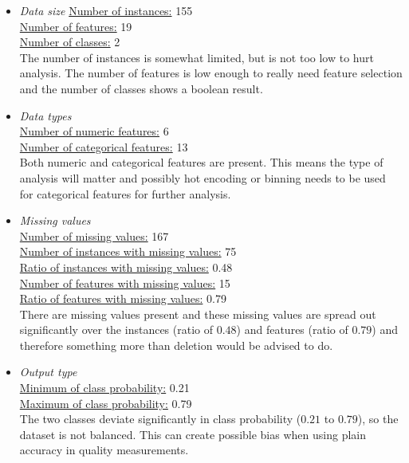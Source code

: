 \documentclass[10pt,a4paper]{report}
\begin{document}
	\begin{itemize}
		\item \textit{Data size}
		\underline{Number of instances:} 155 \\
		\underline{Number of features:} 19\\
		\underline{Number of classes:} 2\\
		
		The number of instances is somewhat limited, but is not too low to hurt analysis. The number of features is low enough to really need feature selection and the number of classes shows a boolean result.
		
		\item \textit{Data types} \\
		\underline{Number of numeric features:} 6 \\
		\underline{Number of categorical features:} 13 \\
		
		Both numeric and categorical features are present. This means the type of analysis will matter and possibly hot encoding or binning needs to be used for categorical features for further analysis.
		
		\item \textit{Missing values} \\
		\underline{Number of missing values:} 167 \\
		\underline{Number of instances with missing values:} 75 \\
		\underline{Ratio of instances with missing values:} 0.48 \\
		\underline{Number of features with missing values:} 15 \\
		\underline{Ratio of features with missing values:} 0.79 \\
		
		There are missing values present and these missing values are spread out significantly over the instances (ratio of $0.48$) and features (ratio of $0.79$) and therefore something more than deletion would be advised to do.
		
		\item \textit{Output type} \\
		\underline{Minimum of class probability:} 0.21 \\
		\underline{Maximum of class probability:} 0.79 \\
		
		The two classes deviate significantly in class probability ($0.21$ to $0.79$), so the dataset is not balanced. This can create possible bias when using plain accuracy in quality measurements.
		

\end{itemize}
\end{document}
